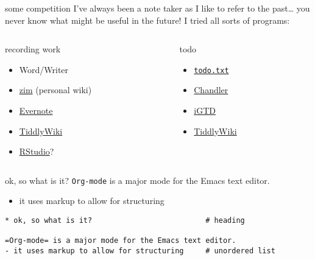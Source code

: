 \documentclass[aspectratio=169,presentation,bigger,fleqn,t]{beamer}
\begin{document}
\begin{frame}[fragile,label={sec:orgheadline3}]{some competition}
 I've always been a note taker as I like to refer to the past\ldots{} you never know what
might be useful in the future! I tried all sorts of programs:

\begin{columns}
\begin{column}{0.5\columnwidth}
\begin{block}{recording work}
\begin{itemize}
\item Word/Writer
\item \href{http://zim-wiki.org/}{zim} (personal wiki)
\item \href{https://evernote.com/}{Evernote}
\item \href{http://tiddlywiki.com/}{TiddlyWiki}
\item \href{https://www.rstudio.com/}{RStudio}?
\end{itemize}
\end{block}
\end{column}


\begin{column}{0.5\columnwidth}
\begin{block}{todo}
\begin{itemize}
\item \href{http://todotxt.com/}{\texttt{todo.txt}}
\item \href{https://en.wikipedia.org/wiki/Chandler_(software)}{Chandler}
\item \href{https://itunes.apple.com/us/app/igtd/id488595283?mt=8}{iGTD}
\item \href{http://tiddlywiki.com/}{TiddlyWiki}
\end{itemize}
\end{block}
\end{column}
\end{columns}
\end{frame}

\begin{frame}[fragile,label={sec:orgheadline4}]{ok, so what is it?}
 \texttt{Org-mode} is a major mode for the Emacs text editor.
\begin{itemize}
\item it uses markup to allow for structuring
\end{itemize}

\begin{verbatim}
* ok, so what is it?                          # heading

=Org-mode= is a major mode for the Emacs text editor.
- it uses markup to allow for structuring     # unordered list
\end{verbatim}
\end{frame}
\end{document}
